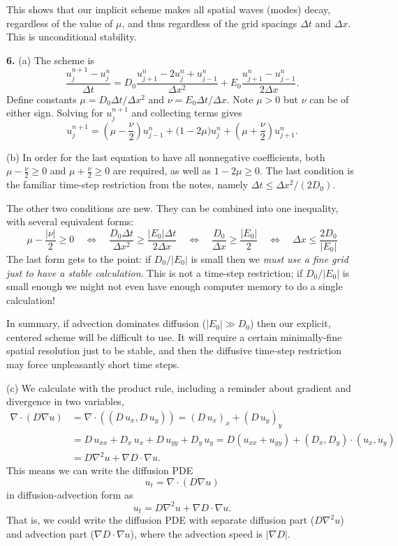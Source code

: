 \documentclass[10pt]{amsart}
\newcommand{\Div}{\nabla\cdot}
\newcommand{\grad}{\nabla}
\newcommand{\prob}[1]{\bigskip\noindent\large\textbf{#1.}\normalsize }
\begin{document}
This shows that our implicit scheme makes all spatial waves (modes) decay, regardless of the value of $\mu$, and thus regardless of the grid spacings $\Delta t$ and $\Delta x$.  This is unconditional stability.

\prob{6}  (a) The scheme is
    $$\frac{u_j^{n+1} - u_j^n}{\Delta t} = D_0 \frac{u_{j+1}^n - 2 u_j^n + u_{j-1}^n}{\Delta x^2} + E_0 \frac{u_{j+1}^n - u_{j-1}^n}{2\Delta x}.$$
Define constants $\mu = D_0 \Delta t/\Delta x^2$ and $\nu = E_0 \Delta t/\Delta x$.  Note $\mu>0$ but $\nu$ can be of either sign.  Solving for $u_j^{n+1}$ and collecting terms gives
    $$u_j^{n+1} = \left(\mu - \frac{\nu}{2}\right) u_{j-1}^n + \big(1-2\mu\big) u_j^n + \left(\mu + \frac{\nu}{2}\right) u_{j+1}^n.$$

\medskip
\noindent (b)  In order for the last equation to have all nonnegative coefficients, both $\mu - \frac{\nu}{2} \ge 0$ and $\mu + \frac{\nu}{2} \ge 0$ are required, as well as $1-2\mu \ge 0$.  The last condition is the familiar time-step restriction from the notes, namely $\Delta t \le \Delta x^2 / (2 D_0)$.

The other two conditions are new.  They can be combined into one inequality, with several equivalent forms:
    $$\mu - \frac{|\nu|}{2} \ge 0  \quad\iff\quad  \frac{D_0 \Delta t}{\Delta x^2} \ge \frac{|E_0| \Delta t}{2\Delta x}  \quad\iff\quad  \frac{D_0}{\Delta x} \ge \frac{|E_0|}{2}  \quad\iff\quad  \Delta x \le \frac{2 D_0}{|E_0|}$$
The last form gets to the point: if $D_0/|E_0|$ is small then we \emph{must use a fine grid just to have a stable calculation}.  This is not a time-step restriction; if $D_0/|E_0|$ is small enough we might not even have enough computer memory to do a single calculation!

In summary, if advection dominates diffusion ($|E_0| \gg D_0$) then our explicit, centered scheme will be difficult to use.  It will require a certain minimally-fine spatial resolution just to be stable, and then the diffusive time-step restriction may force unpleasantly short time steps.

\medskip
\noindent (c)  We calculate with the product rule, including a reminder about gradient and divergence in two variables,
\begin{align*}
\Div \left(D \grad u\right) &= \Div \left((D\,u_x,D\,u_y)\right) = (D\,u_x)_x + (D\,u_y)_y \\
  &= D\,u_{xx} + D_x\,u_x + D\,u_{yy} + D_y\,u_y = D (u_{xx} + u_{yy}) + (D_x,D_y)\cdot(u_x,u_y) \\
  &= D \grad^2 u + \grad D \cdot \grad u.
\end{align*}
This means we can write the diffusion PDE
    $$u_t = \Div \left(D \grad u\right)$$
 in diffusion-advection form as
    $$u_t = D \grad^2 u + \grad D \cdot \grad u.$$
That is, we could write the diffusion PDE with separate diffusion part ($D \grad^2 u$) and advection part ($\grad D \cdot \grad u$), where the advection speed is $|\grad D|$.
\end{document}
